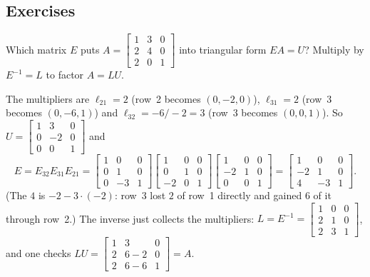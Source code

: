 \subsection{Exercises}

\begin{exercise}\label{ex:u05-EA}
Which matrix $E$ puts $A=\begin{bmatrix} 1&3&0\\ 2&4&0\\ 2&0&1\end{bmatrix}$ into triangular form
$EA=U$? Multiply by $E^{-1}=L$ to factor $A=LU$.
\end{exercise}
\begin{solution}
The multipliers are $\ell_{21}=2$ (row~2 becomes $(0,-2,0)$), $\ell_{31}=2$ (row~3 becomes
$(0,-6,1)$) and $\ell_{32}=-6/-2=3$ (row~3 becomes $(0,0,1)$). So
$U=\begin{bmatrix} 1&3&0\\ 0&-2&0\\ 0&0&1\end{bmatrix}$ and
\[
  E=E_{32}E_{31}E_{21}
  =\begin{bmatrix} 1&0&0\\ 0&1&0\\ 0&-3&1\end{bmatrix}
   \begin{bmatrix} 1&0&0\\ 0&1&0\\ -2&0&1\end{bmatrix}
   \begin{bmatrix} 1&0&0\\ -2&1&0\\ 0&0&1\end{bmatrix}
  =\begin{bmatrix} 1&0&0\\ -2&1&0\\ 4&-3&1\end{bmatrix}.
\]
(The $4$ is $-2-3\cdot(-2)$: row~3 lost $2$ of row~1 directly and gained $6$ of it through row~2.)
The inverse just collects the multipliers:
$L=E^{-1}=\begin{bmatrix} 1&0&0\\ 2&1&0\\ 2&3&1\end{bmatrix}$, and one checks
$LU=\begin{bmatrix} 1&3&0\\ 2&6-2&0\\ 2&6-6&1\end{bmatrix}=A$.
\end{solution}

